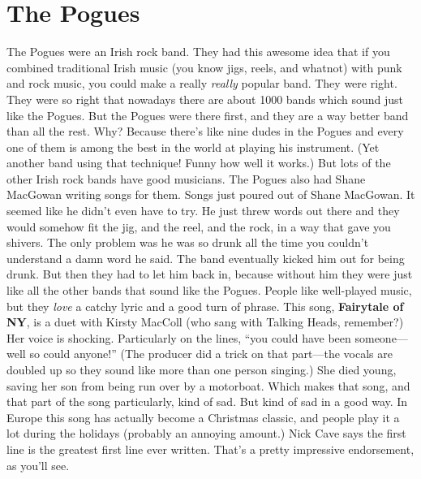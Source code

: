 \documentclass[letterpaper,single]{article}
\begin{document}
\section{The Pogues}
The Pogues were an Irish rock band. They had this awesome idea that if
you combined traditional Irish music (you know jigs, reels, and whatnot)
with punk and rock music, you could make a really \emph{really} popular
band. They were right. They were so right that nowadays there are about
1000 bands which sound just like the Pogues. But the Pogues were there
first, and they are a way better band than all the rest. Why? Because
there's like nine dudes in the Pogues and every one of them is among the
best in the world at playing his instrument. (Yet another band using
that technique! Funny how well it works.) But lots of the other Irish
rock bands have good musicians. The Pogues also had Shane MacGowan
writing songs for them. Songs just poured out of Shane MacGowan. It
seemed like he didn't even have to try. He just threw words out there
and they would somehow fit the jig, and the reel, and the rock, in a
way that gave you shivers. The only problem was he was so drunk all the
time you couldn't understand a damn word he said. The band eventually
kicked him out for being drunk. But then they had to let him back in,
because without him they were just like all the other bands that sound
like the Pogues. People like well-played music, but they \emph{love}
a catchy lyric and a good turn of phrase. This song, \textbf{Fairytale
of NY}, is a duet with Kirsty MacColl (who sang with Talking Heads,
remember?) Her voice is shocking. Particularly on the lines, ``you
could have been someone---well so could anyone!'' (The producer did a
trick on that part---the vocals are doubled up so they sound like more
than one person singing.) She died young, saving her son from being run
over by a motorboat. Which makes that song, and that part of the song
particularly, kind of sad. But kind of sad in a good way. In Europe
this song has actually become a Christmas classic, and people play it a
lot during the holidays (probably an annoying amount.) Nick Cave says
the first line is the greatest first line ever written. That's a pretty
impressive endorsement, as you'll see.
\end{document}
